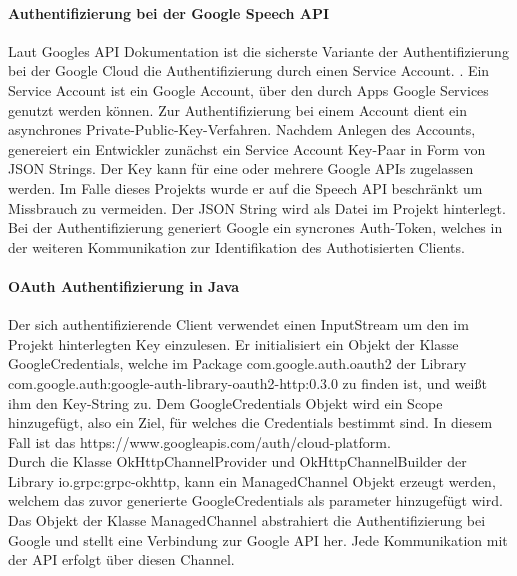 \paragraph{Authentifizierung bei der Google Speech API}
Laut Googles API Dokumentation ist die sicherste Variante der Authentifizierung bei der Google Cloud die Authentifizierung durch einen Service Account. \cite{ https://cloud.google.com/speech/docs/common/auth}. Ein Service Account ist ein Google Account, über den durch Apps Google Services genutzt werden können. Zur Authentifizierung bei einem Account dient ein asynchrones Private-Public-Key-Verfahren. Nachdem Anlegen des Accounts, genereiert ein Entwickler zunächst ein Service Account Key-Paar in Form von JSON Strings. Der Key kann für eine oder mehrere Google APIs zugelassen werden. Im Falle dieses Projekts wurde er auf die Speech API beschränkt um Missbrauch zu vermeiden. Der JSON String wird als Datei im Projekt hinterlegt. Bei der Authentifizierung generiert Google ein syncrones Auth-Token, welches in der weiteren Kommunikation zur Identifikation des Authotisierten Clients.\\

\paragraph{OAuth Authentifizierung in Java}
Der sich authentifizierende Client verwendet einen InputStream um den im Projekt hinterlegten Key einzulesen. Er initialisiert ein Objekt der Klasse GoogleCredentials, welche im Package com.google.auth.oauth2 der Library com.google.auth:google-auth-library-oauth2-http:0.3.0 zu finden ist, und weißt ihm den Key-String zu. Dem GoogleCredentials Objekt wird ein Scope hinzugefügt, also ein Ziel, für welches die Credentials bestimmt sind. In diesem Fall ist das https://www.googleapis.com/auth/cloud-platform.\\
Durch die Klasse OkHttpChannelProvider und OkHttpChannelBuilder der Library io.grpc:grpc-okhttp, kann ein ManagedChannel Objekt erzeugt werden, welchem das zuvor generierte GoogleCredentials als parameter hinzugefügt wird. Das Objekt der Klasse ManagedChannel abstrahiert die Authentifizierung bei Google und stellt eine Verbindung zur Google API her. Jede Kommunikation mit der API erfolgt über diesen Channel.

